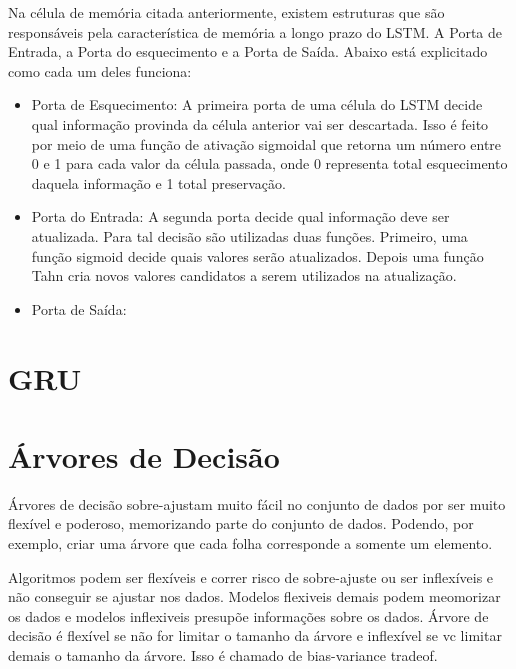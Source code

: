 Na célula de memória citada anteriormente, existem estruturas que são responsáveis pela característica de memória a longo prazo do \acrshort{LSTM}. A Porta de Entrada, a Porta do esquecimento e a Porta de Saída. Abaixo está explicitado como cada um deles funciona:

\begin{itemize}
  \item Porta de Esquecimento: A primeira porta de uma célula do \acrfull{LSTM} decide qual informação provinda da célula anterior vai ser descartada. Isso é feito por meio de uma função de ativação sigmoidal que retorna um número entre 0 e 1 para cada valor da célula passada, onde 0 representa total esquecimento daquela informação e 1 total preservação.
  
  \item Porta do Entrada: A segunda porta decide qual informação deve ser atualizada. Para tal decisão são utilizadas duas funções. Primeiro, uma função sigmoid decide quais valores serão atualizados. Depois uma função Tahn cria novos valores candidatos a serem utilizados na atualização.
  \item Porta de Saída:
\end{itemize}


\section{\acrfull{GRU}}



\section{Árvores de Decisão}


Árvores de decisão sobre-ajustam muito fácil no conjunto de dados por ser muito flexível e poderoso, memorizando parte do conjunto de dados. Podendo, por exemplo, criar uma árvore que cada folha corresponde a somente um elemento.

 Algoritmos podem ser flexíveis e correr risco de sobre-ajuste ou ser inflexíveis e não conseguir se ajustar nos dados. Modelos flexiveis demais podem  meomorizar os dados e modelos inflexiveis presupõe informações sobre os dados.
 Árvore de decisão é flexível se não for limitar o tamanho da árvore e inflexível se vc limitar demais o tamanho da árvore. Isso é chamado de bias-variance tradeof.
 
